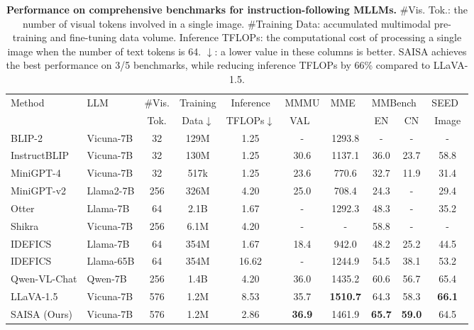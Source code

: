 \begin{table*}[t]
  \centering
  {
  \renewcommand{\arraystretch}{1.0}
 
 \begin{tabular}{ll|c|c|c|c|c|cc|c}
    \toprule
    \multicolumn{1}{l}{\multirow{2}[2]{*}{Method}} & \multirow{2}[2]{*}{LLM} & \#Vis. & Training & Inference & MMMU & \multirow{2}[2]{*}{MME~\cite{fu2024mmecomprehensiveevaluationbenchmark}} & \multicolumn{2}{c|}{MMBench~\cite{liu2024mmbenchmultimodalmodelallaround}} & SEED~\cite{li2023seedbenchbenchmarkingmultimodalllms} \\
          &       & Tok. & Data$\downarrow$ & TFLOPs$\downarrow$ & VAL~\cite{yue2024mmmumassivemultidisciplinemultimodal} &       & EN & CN & Image \\
    \midrule
    BLIP-2 & Vicuna-7B & 32    & 129M  & 1.25  & -     & 1293.8 & -     & -     & - \\
    InstructBLIP & Vicuna-7B & 32    & 130M  & 1.25  & 30.6  & 1137.1 & 36.0  & 23.7  & 58.8 \\
    MiniGPT-4 & Vicuna-7B & 32    & 517k  & 1.25  & 23.6  & 770.6 & 32.7  & 11.9  & 31.4 \\
    MiniGPT-v2 & Llama2-7B & 256   & 326M   & 4.20  & 25.0  & 708.4 & 24.3  & -     & 29.4 \\
    Otter & Llama-7B & 64    & 2.1B  & 1.67  & -     & 1292.3 & 48.3  & -     & 35.2 \\
    Shikra & Vicuna-7B & 256   & 6.1M  & 4.20  & -     & -     & 58.8  & -     & - \\
    IDEFICS & Llama-7B & 64    & 354M  & 1.67  & 18.4  & 942.0  & 48.2  & 25.2  & 44.5 \\
    IDEFICS & Llama-65B & 64    & 354M  & 16.62 & -     & 1244.9     & 54.5  & 38.1  & 53.2 \\
    Qwen-VL-Chat & Qwen-7B & 256   & 1.4B  & 4.20  & 36.0  & 1435.2 & 60.6  & 56.7  & 65.4 \\
    LLaVA-1.5 & Vicuna-7B & 576   & 1.2M  & 8.53  & 35.7  & \textbf{1510.7} & 64.3  & 58.3  & \textbf{66.1} \\
    \rowcolor{cyan!20} SAISA (Ours) & Vicuna-7B & 576   & 1.2M  & 2.86  & \textbf{36.9} & 1461.9 & \textbf{65.7} & \textbf{59.0} & 64.5 \\
    \bottomrule
    \end{tabular}%
    }
  \caption{\textbf{Performance on comprehensive benchmarks for instruction-following MLLMs.}
  \#Vis. Tok.: the number of visual tokens involved in a single image.
  \#Training Data: accumulated multimodal pre-training and fine-tuning data volume.
  Inference TFLOPs: the computational cost of processing a single image when the number of text tokens is 64.
  $\downarrow$: a lower value in these columns is better.
    SAISA achieves the best performance on 3/5 benchmarks, while reducing inference TFLOPs by 66\% compared to LLaVA-1.5.
  }
  \label{tab:mllms}%
\end{table*}